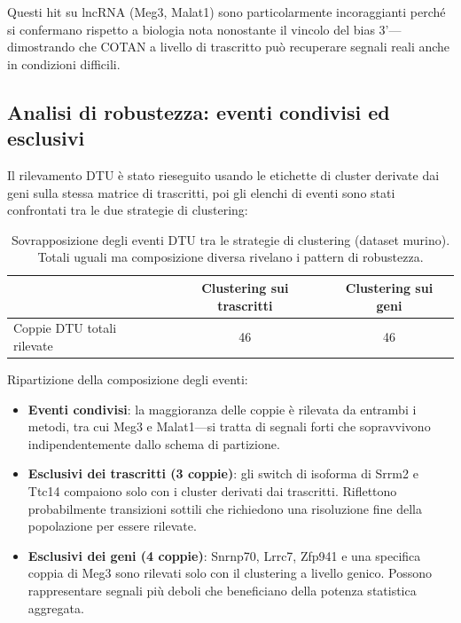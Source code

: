 Questi hit su lncRNA (Meg3, Malat1) sono particolarmente incoraggianti perché si confermano rispetto a biologia nota nonostante il vincolo del bias 3'---dimostrando che COTAN a livello di trascritto può recuperare segnali reali anche in condizioni difficili.


\subsection*{Analisi di robustezza: eventi condivisi ed esclusivi}\label{sec:robustness}

Il rilevamento DTU è stato rieseguito usando le etichette di cluster derivate dai geni sulla stessa matrice di trascritti, poi gli elenchi di eventi sono stati confrontati tra le due strategie di clustering:

\begin{table}[htbp]
\centering
\begin{tabular}{lcc}
    \toprule
    & \textbf{Clustering sui trascritti} & \textbf{Clustering sui geni} \\
    \midrule
    Coppie DTU totali rilevate & 46 & 46 \\
    \bottomrule
\end{tabular}
\caption{Sovrapposizione degli eventi DTU tra le strategie di clustering (dataset murino). Totali uguali ma composizione diversa rivelano i pattern di robustezza.}
\label{tab:dtu-robustness}
\end{table}

Ripartizione della composizione degli eventi:
\begin{itemize}
    \item \textbf{Eventi condivisi}: la maggioranza delle coppie è rilevata da entrambi i metodi, tra cui Meg3 e Malat1---si tratta di segnali forti che sopravvivono indipendentemente dallo schema di partizione.
    
    \item \textbf{Esclusivi dei trascritti (3 coppie)}: gli switch di isoforma di Srrm2 e Ttc14 compaiono solo con i cluster derivati dai trascritti. Riflettono probabilmente transizioni sottili che richiedono una risoluzione fine della popolazione per essere rilevate.

    \item \textbf{Esclusivi dei geni (4 coppie)}: Snrnp70, Lrrc7, Zfp941 e una specifica coppia di Meg3 sono rilevati solo con il clustering a livello genico. Possono rappresentare segnali più deboli che beneficiano della potenza statistica aggregata.
\end{itemize}

